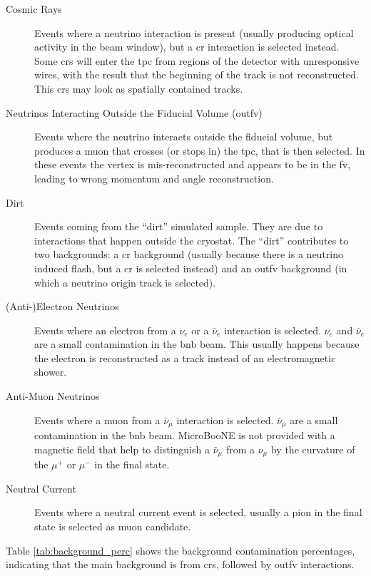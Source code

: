 \begin{description}
\item[Cosmic Rays] Events where a neutrino interaction is present (usually producing optical activity in the beam window), but a \acrshort{cr} interaction is selected instead. Some \acrshort{cr}s will enter the \acrshort{tpc} from regions of the detector with unresponsive wires, with the result that the beginning of the track is not reconstructed. This \acrshort{cr}s may look as spatially contained tracks. 
\item[Neutrinos Interacting Outside the Fiducial Volume (\acrshort{outfv})] Events where the neutrino interacts outside the fiducial volume, but produces a muon that crosses (or stops in) the \acrshort{tpc}, that is then selected. In these events the vertex is mis-reconstructed and appears to be in the \acrshort{fv}, leading to wrong momentum and angle reconstruction. 
\item[Dirt] Events coming from the ``dirt'' simulated sample. They are due to interactions that happen outside the cryostat. The ``dirt'' contributes to two backgrounds: a \acrshort{cr} background (usually because there is a neutrino induced flash, but a \acrshort{cr} is selected instead) and an \acrshort{outfv} background (in which a neutrino origin track is selected).
\item[(Anti-)Electron Neutrinos] Events where an electron from a $\nu_e$ or a $\bar{\nu}_e$ interaction is selected. $\nu_e$ and $\bar{\nu}_e$ are a small contamination in the \acrshort{bnb} beam. This usually happens because the electron is reconstructed as a track instead of an electromagnetic shower.
\item[Anti-Muon Neutrinos] Events where a muon from a $\bar{\nu}_\mu$ interaction is selected. $\bar{\nu}_\mu$ are a small contamination in the \acrshort{bnb} beam. MicroBooNE is not provided with a magnetic field that help to distinguish a $\bar{\nu}_\mu$ from a $\nu_\mu$ by the curvature of the $\mu^+$ or $\mu^-$ in the final state.
\item[Neutral Current] Events where a neutral current event is selected, usually a pion in the final state is selected as muon candidate.
\end{description}
Table \ref{tab:background_perc} shows the background contamination percentages, indicating that the main background is from \acrshort{cr}s, followed by \acrshort{outfv} interactions. 
